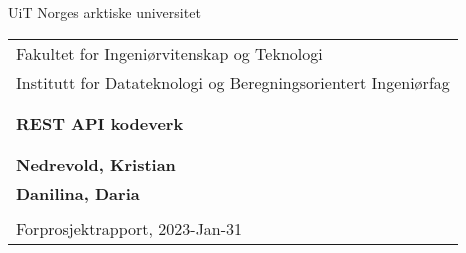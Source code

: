 \begin{center}
\hfill \break
\large{UiT Norges arktiske universitet}\\
\hfill \break
\hfill \break
\hfill \break

\begin{tabular}{l}
     Fakultet for Ingeniørvitenskap og Teknologi  \\
     Institutt for Datateknologi og Beregningsorientert Ingeniørfag \\\\
     \hfill \break\\
     \large{\textbf{REST API kodeverk}}\\
     \hfill \break\\
     \hfill \break\\     
     \textbf{Nedrevold, Kristian}\\
     \textbf{Danilina, Daria}\\
     \hfill \break\\
     Forprosjektrapport, 2023-Jan-31\\
\end{tabular}

\hfill \break
\hfill \break
\hfill \break
\hfill \break
\hfill \break
\hfill \break
\hfill \break
\hfill \break
\hfill \break
\hfill \break
\hfill \break
\hfill \break
\hfill \break
\hfill \break
\thispagestyle{empty} 
\end{center}
